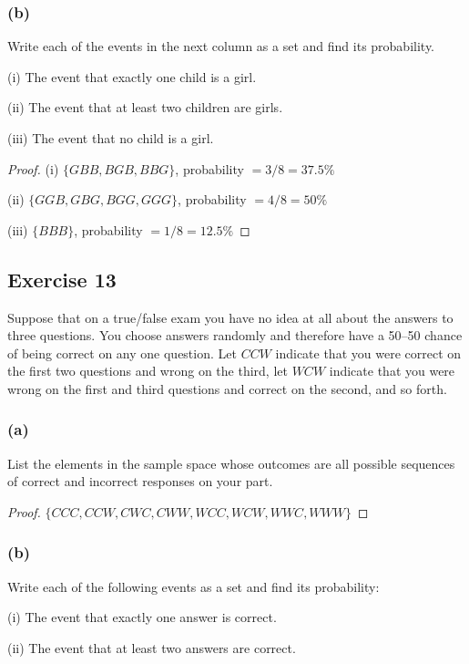\documentclass[14pt]{extarticle}
\begin{document}
\subsubsection{(b)}
Write each of the events in the next column as a set and find its probability.

(i) The event that exactly one child is a girl.

(ii) The event that at least two children are girls.

(iii) The event that no child is a girl.

\begin{proof}
     (i) \(\{GBB, BGB, BBG\}\), probability \(= 3/8 = 37.5\%\)

     (ii) \(\{GGB, GBG, BGG, GGG\}\), probability \(= 4/8 = 50\%\)

     (iii) \(\{BBB\}\), probability \(= 1/8 = 12.5\%\)
\end{proof}

\subsection{Exercise 13}
Suppose that on a true/false exam you have no idea at all about the answers to three questions. You choose answers
randomly and therefore have a 50–50 chance of being correct on any one question. Let \(CCW\) indicate that you were
correct on the first two questions and wrong on the third, let \(WCW\) indicate that you were wrong on the first and
third questions and correct on the second, and so forth.

\subsubsection{(a)}
List the elements in the sample space whose outcomes are all possible sequences of correct and incorrect responses
on your part.

\begin{proof}
     \(\{CCC, CCW, CWC, CWW, WCC, WCW, WWC, WWW\}\)
\end{proof}

\subsubsection{(b)}
Write each of the following events as a set and find its probability:

(i) The event that exactly one answer is correct.

(ii) The event that at least two answers are correct.
\end{document}
